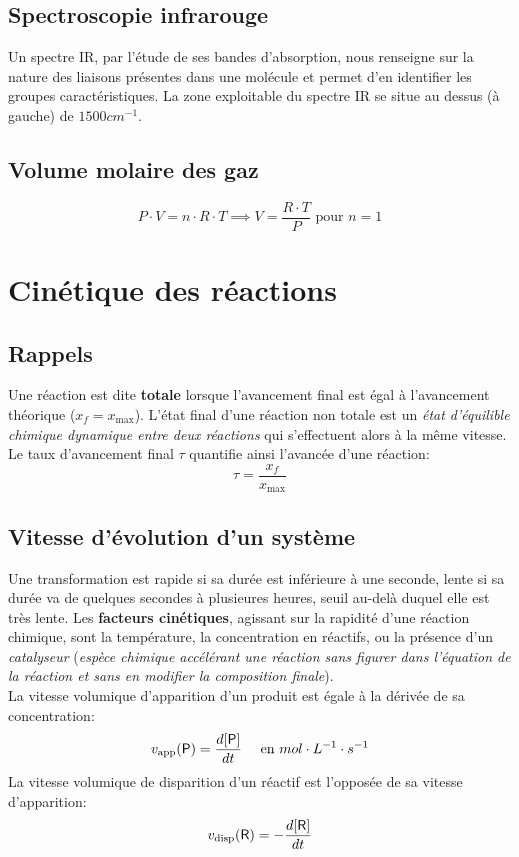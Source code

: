 \documentclass[a5paper,10pt]{article}
\begin{document}
\vspace{0.1em}
\subsection{Spectroscopie infrarouge}
Un spectre IR, par l'étude de ses bandes d'absorption, nous renseigne sur la nature des liaisons présentes dans une molécule et permet d'en identifier les groupes caractéristiques.
La zone exploitable du spectre IR se situe au dessus (à gauche) de $1500cm^{-1}$.

\vspace{0.1em}
\subsection{Volume molaire des gaz}
$$P\cdot V =n\cdot R\cdot T \implies V=\frac{R\cdot T}{P} \text{ pour } n=1$$

\section{Cinétique des réactions}
\subsection{Rappels}
Une réaction est dite \textbf{totale} lorsque l'avancement final est égal à l'avancement théorique ($x_f=x_{\text{max}}$).
L'état final d'une réaction non totale est un \textit{état d'équilible chimique \linebreak dynamique entre deux réactions} qui s'effectuent alors à la même vitesse.\\
Le taux d'avancement final $\tau$ quantifie ainsi l'avancée d'une réaction:
$$\tau=\frac{x_f}{x_{\text{max}}}$$


\subsection{Vitesse d'évolution d'un système}
Une transformation est rapide si sa durée est inférieure à une seconde, lente si sa durée va de quelques secondes à plusieures heures, seuil au-delà duquel elle est très lente.
Les \textbf{facteurs cinétiques}, agissant sur la rapidité d'une réaction chimique, sont la température, la concentration en réactifs, ou la présence d'un \textit{catalyseur} (\textit{espèce chimique accélérant une réaction sans figurer dans l'équation de la réaction et sans en modifier la composition finale}).\\[4pt]
La vitesse volumique d'apparition d'un produit est égale à la dérivée de sa concentration:
$$v_{\text{app}}(\text{\ce{P}})=\frac{d[\text{\ce{P}}]}{dt} \quad\text{ en } mol\cdot L^{-1}\cdot s^{-1}$$
La vitesse volumique de disparition d'un réactif est l'opposée de sa vitesse d'apparition:
$$v_{\text{disp}}(\text{\ce{R}})=-\frac{d[\text{\ce{R}}]}{dt}$$
\end{document}
